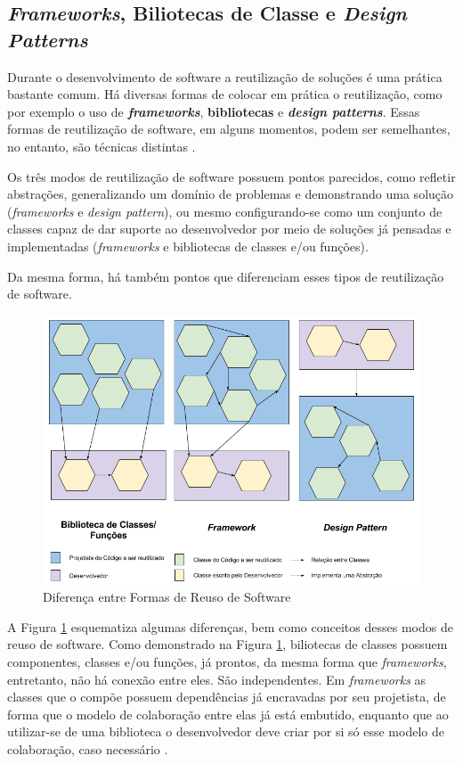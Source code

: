 \subsection{\textit{Frameworks}, Biliotecas de Classe e \textit{Design Patterns}}
Durante o desenvolvimento de software a reutilização de soluções é uma prática bastante comum. Há diversas formas de colocar em prática o reutilização, como por exemplo o uso de \textbf{\textit{frameworks}}, \textbf{bibliotecas} e \textbf{\textit{design patterns}}. Essas formas de reutilização de software, em alguns momentos, podem ser semelhantes, no entanto, são técnicas distintas \cite{barretoJunior2006}.
\par
\indent Os três modos de reutilização de software possuem pontos parecidos, como refletir abstrações, generalizando um domínio de problemas e demonstrando uma solução (\textit{frameworks} e \textit{design pattern}), ou mesmo configurando-se como um conjunto de classes capaz de dar suporte ao desenvolvedor por meio de soluções já pensadas e implementadas (\textit{frameworks} e bibliotecas de classes e/ou funções).
\par
\indent Da mesma forma, há também pontos que diferenciam esses tipos de reutilização de software.
  \begin{figure}[h]
    \centering
    \includegraphics[width=\textwidth]{figuras/bibFrameworkDesignPattern.png}
    \caption{Diferença entre Formas de Reuso de Software}
    \label{fig:bibFrameworkPattern}
  \end{figure}
\par
\indent A Figura \ref{fig:bibFrameworkPattern} esquematiza algumas diferenças, bem como conceitos desses modos de reuso de software. Como demonstrado na Figura \ref{fig:bibFrameworkPattern}, biliotecas de classes possuem componentes, classes e/ou funções, já prontos, da mesma forma que \textit{frameworks}, entretanto, não há conexão entre eles. São independentes. Em \textit{frameworks} as classes que o compõe possuem dependências já encravadas por seu projetista, de forma que o modelo de colaboração entre elas já está embutido, enquanto que ao utilizar-se de uma biblioteca o desenvolvedor deve criar por si só esse modelo de colaboração, caso necessário \cite{barretoJunior2006}.
